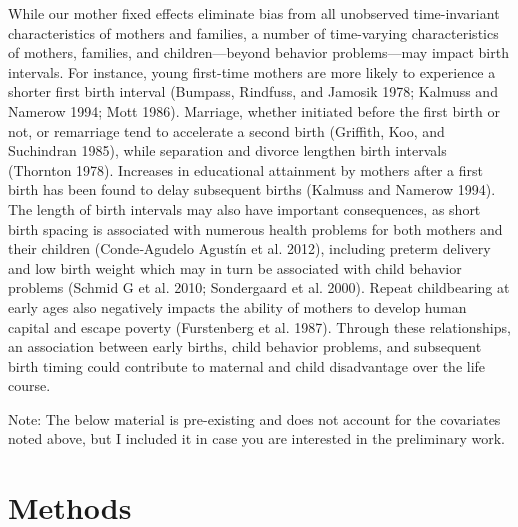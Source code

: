 \documentclass[]{article}
\begin{document}
While our mother fixed effects eliminate bias from all unobserved
time-invariant characteristics of mothers and families, a number of
time-varying characteristics of mothers, families, and children---beyond
behavior problems---may impact birth intervals. For instance, young
first-time mothers are more likely to experience a shorter first birth
interval (Bumpass, Rindfuss, and Jamosik 1978; Kalmuss and Namerow 1994;
Mott 1986). Marriage, whether initiated before the first birth or not,
or remarriage tend to accelerate a second birth (Griffith, Koo, and
Suchindran 1985), while separation and divorce lengthen birth intervals
(Thornton 1978). Increases in educational attainment by mothers after a
first birth has been found to delay subsequent births (Kalmuss and
Namerow 1994). The length of birth intervals may also have important
consequences, as short birth spacing is associated with numerous health
problems for both mothers and their children (Conde‐Agudelo Agustín et
al. 2012), including preterm delivery and low birth weight which may in
turn be associated with child behavior problems (Schmid G et al. 2010;
Sondergaard et al. 2000). Repeat childbearing at early ages also
negatively impacts the ability of mothers to develop human capital and
escape poverty (Furstenberg et al. 1987). Through these relationships,
an association between early births, child behavior problems, and
subsequent birth timing could contribute to maternal and child
disadvantage over the life course.

Note: The below material is pre-existing and does not account for the
covariates noted above, but I included it in case you are interested in
the preliminary work.

\section{Methods}\label{methods}
\end{document}
